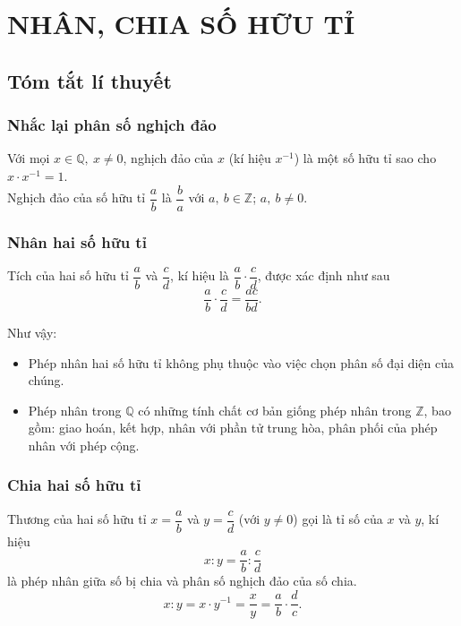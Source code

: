 \section{NHÂN, CHIA SỐ HỮU TỈ}
\subsection{Tóm tắt lí thuyết}
\subsubsection{Nhắc lại phân số nghịch đảo}
Với mọi $ x\in\mathbb{Q},\ x\neq 0 $, nghịch đảo của $ x $ (kí hiệu $ x^{-1} $) là một số hữu tỉ sao cho $ x\cdot x^{-1}=1 $.\\
Nghịch đảo của số hữu tỉ $ \dfrac{a}{b} $ là $ \dfrac{b}{a} $ với $ a,\ b\in\mathbb{Z} $; $ a,\ b\neq 0 $.
\subsubsection{Nhân hai số hữu tỉ}
Tích của hai số hữu tỉ $ \dfrac{a}{b} $ và $ \dfrac{c}{d} $, kí hiệu là $ \dfrac{a}{b}\cdot \dfrac{c}{d} $, được xác định như sau
\[ 
\dfrac{a}{b}\cdot \dfrac{c}{d}=\dfrac{ac}{bd}.
\]
\begin{note}
	Như vậy:
	\begin{itemize}
	\item Phép nhân hai số hữu tỉ không phụ thuộc vào việc chọn phân số đại diện của chúng.
	\item Phép nhân trong $ \mathbb{Q} $ có những tính chất cơ bản giống phép nhân trong $ \mathbb{Z} $, bao gồm: giao hoán, kết hợp, nhân với phần tử trung hòa, phân phối của phép nhân với phép cộng. 
	\end{itemize}
\end{note}
\subsubsection{Chia hai số hữu tỉ}
Thương của hai số hữu tỉ $ x=\dfrac{a}{b} $ và $ y=\dfrac{c}{d} $ (với $ y\neq 0 $) gọi là tỉ số của $ x $ và $ y $, kí hiệu
\[ 
x:y=\dfrac{a}{b}:\dfrac{c}{d}
\]
là phép nhân giữa số bị chia và phân số nghịch đảo của số chia.
\[ 
x:y=x\cdot y^{-1}=\dfrac{x}{y}=\dfrac{a}{b}\cdot \dfrac{d}{c}.
\]
